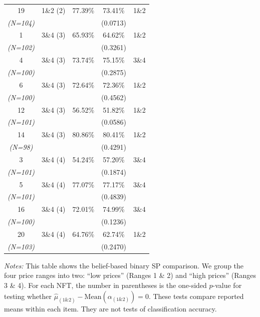 \documentclass[12pt,reqno]{amsart}
\begin{document}
\begin{table}[htbp]
\begin{threeparttable}
\begin{tabular}{ccccc}
19 & 1\&2 (2) & 77.39\% & 73.41\% & 1\&2 \\
    \textit{(N=104)} & & & (0.0713) & \\
\midrule
1 & 3\&4 (3) & 65.93\% & 64.62\% & 1\&2 \\
   \textit{(N=102)} & & & (0.3261) & \\

4 & 3\&4 (3) & 73.74\% & 75.15\% & 3\&4 \\
   \textit{(N=100)} & & & (0.2875) & \\

6 & 3\&4 (3) & 72.64\% & 72.36\% & 1\&2 \\
   \textit{(N=100)} & & & (0.4562) & \\

12 & 3\&4 (3) & 56.52\% & 51.82\% & 1\&2 \\
    \textit{(N=101)} & & & (0.0586) & \\

14 & 3\&4 (3) & 80.86\% & 80.41\% & 1\&2 \\
   \textit{(N=98)} & & & (0.4291) & \\
\midrule
3 & 3\&4 (4) & 54.24\% & 57.20\% & 3\&4 \\
  \textit{(N=101)} & & & (0.1874) & \\

5 & 3\&4 (4) & 77.07\% & 77.17\% & 3\&4 \\
  \textit{(N=101)} & & & (0.4839) & \\

16 & 3\&4 (4) & 72.01\% & 74.99\% & 3\&4 \\
   \textit{(N=100)} & & & (0.1236) & \\

20 & 3\&4 (4) & 64.76\% & 62.74\% & 1\&2 \\
    \textit{(N=103)} & & & (0.2470) & \\

\bottomrule
\end{tabular}

\begin{tablenotes}[flushleft]\footnotesize
\item \textit{Notes:} This table shows the belief-based binary SP comparison. We group the four price ranges into two: ``low prices'' (Ranges 1 \& 2) and ``high prices'' (Ranges 3 \& 4). For each NFT, the number in parentheses is the one-sided $p$-value for testing whether $\hat{\mu}_{(1\&2)}-\text{Mean}(\alpha_{(1\&2)})=0$. These tests compare reported means within each item. They are not tests of classification accuracy.
\end{tablenotes}
\end{threeparttable}
\end{table}
\end{document}
